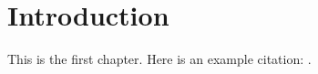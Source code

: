 \chapter{Introduction}
\label{chap:intro}

This is the first chapter.  Here is an example citation:
\citet{rountree98}.
